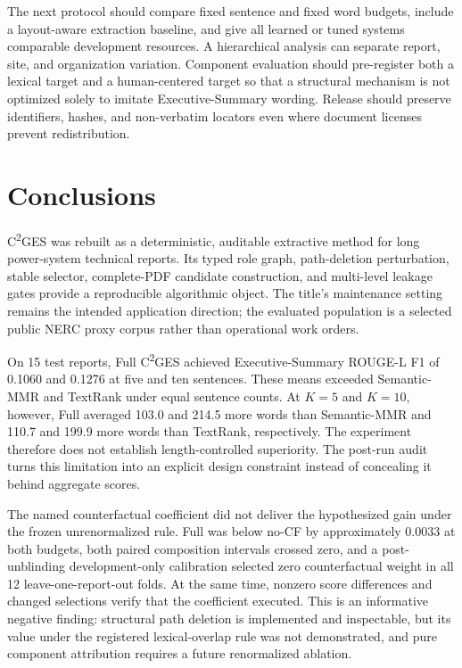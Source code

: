 \documentclass[applsci,article,submit,moreauthors]{Definitions/mdpi}
\newcommand{\cges}{C\textsuperscript{2}GES}
\begin{document}
The next protocol should compare fixed sentence and fixed word budgets, include a layout-aware extraction baseline, and give all learned or tuned systems comparable development resources. A hierarchical analysis can separate report, site, and organization variation. Component evaluation should pre-register both a lexical target and a human-centered target so that a structural mechanism is not optimized solely to imitate Executive-Summary wording. Release should preserve identifiers, hashes, and non-verbatim locators even where document licenses prevent redistribution.

\section{Conclusions}

\cges{} was rebuilt as a deterministic, auditable extractive method for long power-system technical reports. Its typed role graph, path-deletion perturbation, stable selector, complete-PDF candidate construction, and multi-level leakage gates provide a reproducible algorithmic object. The title's maintenance setting remains the intended application direction; the evaluated population is a selected public NERC proxy corpus rather than operational work orders.

On 15 test reports, Full \cges{} achieved Executive-Summary ROUGE-L F1 of 0.1060 and 0.1276 at five and ten sentences. These means exceeded Semantic-MMR and TextRank under equal sentence counts. At $K=5$ and $K=10$, however, Full averaged 103.0 and 214.5 more words than Semantic-MMR and 110.7 and 199.9 more words than TextRank, respectively. The experiment therefore does not establish length-controlled superiority. The post-run audit turns this limitation into an explicit design constraint instead of concealing it behind aggregate scores.

The named counterfactual coefficient did not deliver the hypothesized gain under the frozen unrenormalized rule. Full was below no-CF by approximately 0.0033 at both budgets, both paired composition intervals crossed zero, and a post-unblinding development-only calibration selected zero counterfactual weight in all 12 leave-one-report-out folds. At the same time, nonzero score differences and changed selections verify that the coefficient executed. This is an informative negative finding: structural path deletion is implemented and inspectable, but its value under the registered lexical-overlap rule was not demonstrated, and pure component attribution requires a future renormalized ablation.
\end{document}

